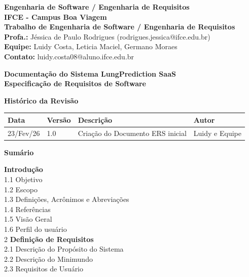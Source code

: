 \documentclass{article}
\begin{document}
\noindent
\textbf{Engenharia de Software / Engenharia de Requisitos}\\
\textbf{IFCE - Campus Boa Viagem}\\
\textbf{Trabalho de Engenharia de Software / Engenharia de Requisitos}\\
\textbf{Profa.:} Jéssica de Paulo Rodrigues (rodrigues.jessica@ifce.edu.br)\\
\textbf{Equipe:} Luidy Costa, Leticia Maciel, Germano Moraes\\
\textbf{Contato:} luidy.costa08@aluno.ifce.edu.br

\vspace{2cm}
\begin{center}
\textbf{Documentação do Sistema LungPrediction SaaS}\\[0.5cm]
\textbf{Especificação de Requisitos de Software}
\end{center}

\vspace{1cm}
\textbf{Histórico da Revisão}

\vspace{0.3cm}
\begin{tabular}{| m{3cm} | m{2cm} | m{7cm} | m{3cm} |}
\hline
\textbf{Data} & \textbf{Versão} & \textbf{Descrição} & \textbf{Autor} \\
\hline
23/Fev/26 & 1.0 & Criação do Documento ERS inicial & Luidy e Equipe \\
\hline
\end{tabular}

\newpage
\begin{center}
\textbf{Sumário}
\end{center}

\vspace{0.5cm}
 \textbf{Introdução} \\
1.1 Objetivo \\
1.2 Escopo \\
1.3 Definições, Acrônimos e Abreviações \\
1.4 Referências \\
1.5 Visão Geral \\
1.6 Perfil do usuário \\

\vspace{0.3cm}
2 \textbf{Definição de Requisitos} \\
2.1 Descrição do Propósito do Sistema \\
2.2 Descrição do Minimundo \\
2.3 Requisitos de Usuário \\
\end{document}
